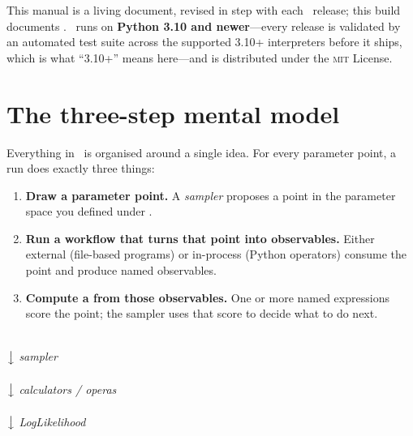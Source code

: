\begin{jnote}
This manual is a living document, revised in step with each \Jarvis\ release; this build
documents \Jversion. \Jarvis\ runs on \textbf{Python 3.10 and newer}---every release is
validated by an automated test suite across the supported 3.10+ interpreters before it
ships, which is what ``3.10+'' means here---and is distributed under the \textsc{mit} License.
\end{jnote}

\section{The three-step mental model}
\label{sec:mental-model}

Everything in \Jarvis\ is organised around a single idea. For every parameter point, a run
does exactly three things:

\begin{enumerate}
  \item \textbf{Draw a parameter point.} A \emph{sampler} proposes a point in the parameter
        space you defined under .
  \item \textbf{Run a workflow that turns that point into observables.} Either external
         (file-based programs) or in-process 
        (Python operators) consume the point and produce named observables.
  \item \textbf{Compute a  from those observables.} One or more named
        expressions score the point; the sampler uses that score to decide what to do next.
\end{enumerate}

\begin{marginfigure}
\centering
{}\\[2pt]
$\big\downarrow$ \emph{sampler}\\[2pt]
\\[2pt]
$\big\downarrow$ \emph{calculators / operas}\\[2pt]
\\[2pt]
$\big\downarrow$ \emph{LogLikelihood}\\[2pt]
\caption[The per-point loop.]{The per-point loop. Keep this picture in mind; every task card
is a way to fill in these three arrows.}
\label{fig:per-point-loop}
\end{marginfigure}

